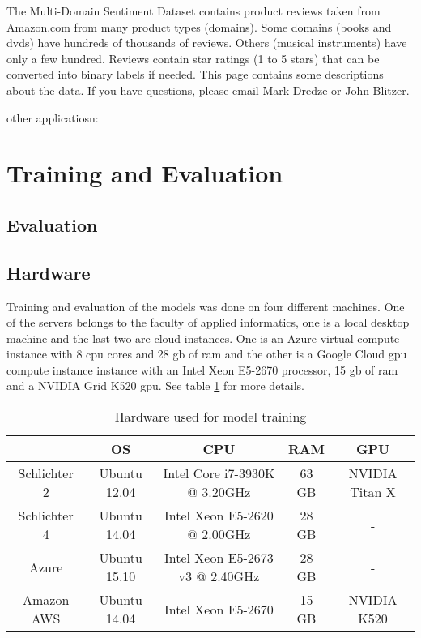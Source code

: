 The Multi-Domain Sentiment Dataset contains product reviews taken from Amazon.com from many product types (domains). Some domains (books and dvds) have hundreds of thousands of reviews. Others (musical instruments) have only a few hundred. Reviews contain star ratings (1 to 5 stars) that can be converted into binary labels if needed. This page contains some descriptions about the data. If you have questions, please email Mark Dredze or John Blitzer. 


other applicatiosn:
\cite{Blitzer2008}



\section{Training and Evaluation}
\label{sec:05_TrainingAndEvaluation}

\subsection{Evaluation}



\subsection{Hardware}

Training and evaluation of the models was done on four different machines. One of the servers belongs to the faculty of applied informatics, one is a local desktop machine and the last two are cloud instances. One is an Azure virtual compute instance with 8 \gls{cpu} cores and 28 \gls{gb} of \gls{ram} and the other is a Google Cloud \gls{gpu} compute instance instance with an Intel Xeon E5-2670 processor, 15 \gls{gb} of \gls{ram} and a NVIDIA Grid K520 \gls{gpu}. See table \ref{tab:05_usedHardware} for more details.
\begin{table}[hbt]
	\centering
	\caption{Hardware used for model training}
	\label{tab:05_usedHardware}
	\begin{tabular}{@{}ccccc@{}}
		\toprule
		\multicolumn{1}{c}{\textbf{}}    & \multicolumn{1}{c}{\textbf{OS}} & \multicolumn{1}{c}{\textbf{CPU}}                    & \multicolumn{1}{c}{\textbf{RAM}} & \multicolumn{1}{c}{\textbf{GPU}}     \\ \midrule
		Schlichter 2 & Ubuntu 12.04              & Intel Core i7-3930K @ 3.20GHz   & 63 GB        & NVIDIA Titan X \\ \midrule
		Schlichter 4 & Ubuntu 14.04              & Intel Xeon E5-2620 @ 2.00GHz    & 28 GB        & -                \\ \midrule
		Azure        & Ubuntu 15.10              & Intel Xeon E5-2673 v3 @ 2.40GHz & 28 GB        & -                \\ \midrule
		Amazon AWS   & Ubuntu 14.04              & Intel Xeon E5-2670              & 15 GB        & NVIDIA K520 \\ \bottomrule
	\end{tabular}
\end{table}



